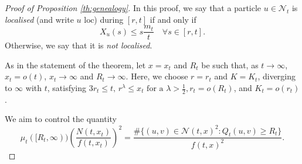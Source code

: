 \documentclass{article}
\begin{document}
\begin{proof}[Proof of Proposition \ref{th:genealogy}]

In this proof, we say that a particle $u\in \mathcal{N}_t$ is \emph{localised} (and write $u \text{ loc}$) during $[r, t ]$ if and only if
\begin{equation}
    X_u(s) \leq s\frac{m_t}{t} \quad \forall s \in [r,t].
\end{equation}
Otherwise, we say that it is \emph{not localised}.

As in the statement of the theorem, let $x=x_t$ and $R_t$  be such that, as $t\to \infty$, $x_t=o(t)$, $x_t\rightarrow \infty$ and $R_t\rightarrow \infty$.
Here, we choose $r=r_t$ and $K=K_t$, diverging to $\infty$ with $t$, satisfying $3r_t\leq t, \, r^{\lambda}\leq x_t \text{ for a } \lambda>\frac{1}{2}, r_t=o(R_t)$, and $K_t=o(r_t)$.  

We aim to control the quantity
\begin{equation}
     \mu_t([R_t, \infty)) \left( \frac{N(t, x_t)}{f(t,x_t)} \right)^2 = \frac{\#\big\{(u,v) \in \mathcal{N}(t,x)^2 : Q_t(u,v) \ge R_t \big\}}{f(t,x)^2}.
\end{equation}


\end{proof}
\end{document}

